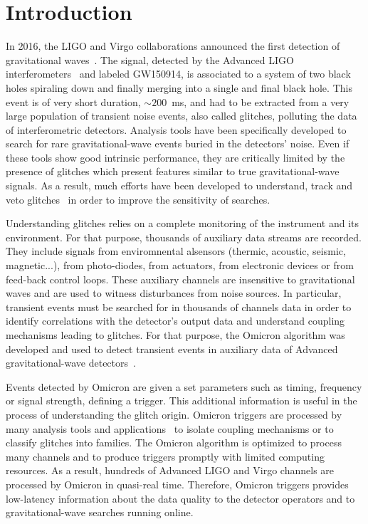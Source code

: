\section{Introduction} \label{sec:introduction}
In 2016, the LIGO and Virgo collaborations announced the first detection of gravitational waves~\cite{Abbott:2016blz}. The signal, detected by the Advanced LIGO interferometers~\cite{Abramovici:1992ah} and labeled GW150914, is associated to a system of two black holes spiraling down and finally merging into a single and final black hole. This event is of very short duration, $\sim200$~ms, and had to be extracted from a very large population of transient noise events, also called glitches, polluting the data of interferometric detectors. Analysis tools have been specifically developed to search for rare gravitational-wave events buried in the detectors' noise. Even if these tools show good intrinsic performance, they are critically limited by the presence of glitches which present features similar to true gravitational-wave signals. As a result, much efforts have been developed to understand, track and veto glitches~\cite{Aasi:2012wd,Aasi:2014mqd,TheLIGOScientific:2016zmo} in order to improve the sensitivity of searches.

Understanding glitches relies on a complete monitoring of the instrument and its environment. For that purpose, thousands of auxiliary data streams are recorded. They include signals from enviromnental alsensors (thermic, acoustic, seismic, magnetic...), from photo-diodes, from actuators, from electronic devices or from feed-back control loops. These auxiliary channels are insensitive to gravitational waves and are used to witness disturbances from noise sources. In particular, transient events must be searched for in thousands of channels data in order to identify correlations with the detector's output data and understand coupling mechanisms leading to glitches. For that purpose, the Omicron algorithm was developed and used to detect transient events in auxiliary data of Advanced gravitational-wave detectors~\cite{Nuttall:2015dqa,TheLIGOScientific:2016zmo}.

Events detected by Omicron are given a set parameters such as timing, frequency or signal strength, defining a trigger. This additional information is useful in the process of understanding the glitch origin. Omicron triggers are processed by many analysis tools and applications~\cite{Isogai:2010zz,Smith:2011an,gspy} to isolate coupling mechanisms or to classify glitches into families. The Omicron algorithm is optimized to process many channels and to produce triggers promptly with limited computing resources. As a result, hundreds of Advanced LIGO and Virgo channels are processed by Omicron in quasi-real time. Therefore, Omicron triggers provides low-latency information about the data quality to the detector operators and to gravitational-wave searches running online.

